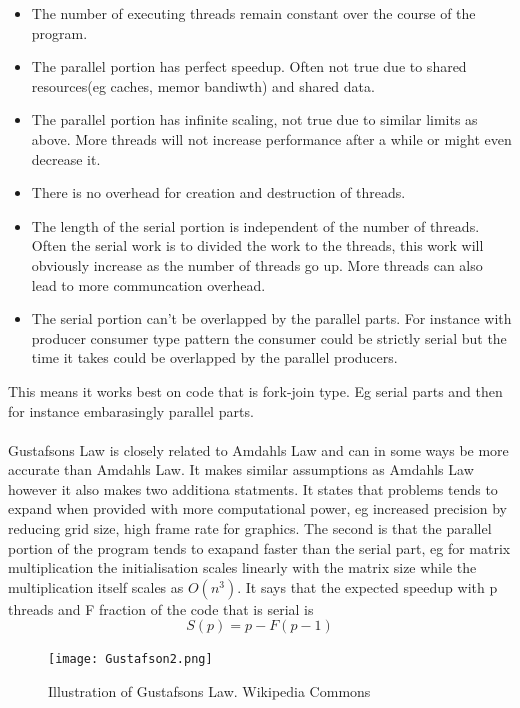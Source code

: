 \documentclass[10pt,a4paper]{article}
\begin{document}
\begin{itemize}
  \item The number of executing threads remain constant over the course of the program.
  \item The parallel portion has perfect speedup. Often not true due to shared resources(eg caches, memor bandiwth) and shared data.
  \item The parallel portion has infinite scaling, not true due to similar limits as above. More threads will not increase performance after a while or might even decrease it.
  \item There is no overhead for creation and destruction of threads.
  \item The length of the serial portion is independent of the number of threads. Often the serial work is to divided the work to the threads, this work will obviously increase as the number of threads go up. More threads can also lead to more communcation overhead.
  \item The serial portion can't be overlapped by the parallel parts. For instance with producer consumer type pattern the consumer could be strictly serial but the time it takes could be overlapped by the parallel producers.
\end{itemize}

This means it works best on code that is fork-join type. Eg serial parts and then for instance embarasingly parallel parts.\\
\\
Gustafsons Law is closely related to Amdahls Law and can in some ways be more accurate than Amdahls Law. It makes similar assumptions as Amdahls Law however it also makes two additiona statments. It states that problems tends to expand when provided with more computational power, eg increased precision by reducing grid size, high frame rate for graphics. The second is that the parallel portion of the program tends to exapand faster than the serial part, eg for matrix multiplication the initialisation scales linearly with the matrix size while the multiplication itself scales as $O(n^3)$. It says that the expected speedup with p threads and F fraction of the code that is serial is\cite{gustafson1988reevaluating}
$$S(p)=p-F(p-1)$$

\begin{figure}[h]
    \centering
    \texttt{[image: Gustafson2.png]}
    \caption{Illustration of Gustafsons Law. Wikipedia Commons}
    \label{fig:GustafsonsLaw}
\end{figure}
\end{document}
